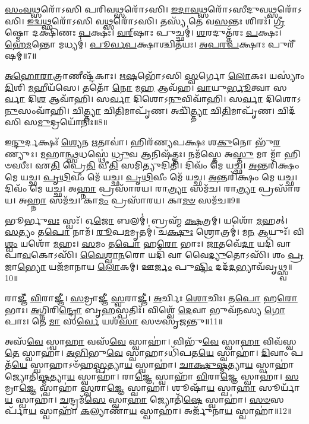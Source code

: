    \ul{𑌸𑌂}\-\-\ul{𑌵}\-\-\ul{𑌥𑍍𑌸}\-𑌰𑍋᳴𑌽𑌸𑌿 𑌪𑌰𑌿𑌵\-\ul{𑌥𑍍𑌸}\-𑌰𑍋᳴\-𑌽𑌸𑌿।
   \ul{𑌇}\-\-\ul{𑌦𑌾}\-\-\ul{𑌵}\-\-\ul{𑌥𑍍𑌸}\-𑌰𑍋᳴𑌽𑌸𑍀𑌦𑍁𑌵\-\ul{𑌥𑍍𑌸}\-𑌰𑍋᳴\-𑌽𑌸𑌿।
   \ul{𑌇}\-\-\ul{𑌦𑍍𑌵}\-\-\ul{𑌥𑍍𑌸}\-𑌰𑍋᳴𑌽𑌸𑌿 𑌵\-\ul{𑌥𑍍𑌸}\-𑌰𑍋᳴\-𑌽𑌸𑌿।
   𑌤𑌸𑍍𑌯᳴ 𑌤𑍇 𑌵\-\ul{𑌸}\-𑌨𑍍𑌤𑌃 𑌶𑌿𑌰𑌃᳴।
   \ul{𑌗𑍍𑌰𑍀}\-𑌷𑍍𑌮𑍋 𑌦𑌕𑍍𑌷𑌿᳴𑌣𑌃 \ul{𑌪}\-𑌕𑍍𑌷𑌃।
   \ul{𑌵}\-\ul{𑌰𑍍}‌𑌷𑌾𑌃 𑌪𑍁𑌚𑍍𑌛𑌮𑍍॑।
   \ul{𑌶}\-𑌰𑌦𑍁𑌤𑍍𑌤᳴𑌰𑌃 \ul{𑌪}\-𑌕𑍍𑌷𑌃।
   \ul{𑌹𑍇}\-\-\ul{𑌮}\-𑌨𑍍𑌤𑍋 𑌮𑌧𑍍𑌯𑌮𑍍॑।
   \ul{𑌪𑍂}\-\-\ul{𑌰𑍍𑌵}\-\-\ul{𑌪}\-𑌕𑍍𑌷𑌾𑌶𑍍𑌚𑌿𑌤᳴𑌯𑌃।
   \ul{𑌅}\-\-\ul{𑌪}\-\-\ul{𑌰}\-\-\ul{𑌪}\-𑌕𑍍𑌷𑌾𑌃 𑌪𑍁𑌰𑍀᳴𑌷𑌮𑍍॥7॥

   \ul{𑌅}\-\-\ul{𑌹𑍋}\-\-\ul{𑌰𑌾}\-𑌤𑍍𑌰𑌾𑌣𑍀𑌷𑍍𑌟᳴𑌕𑌾𑌃।
   \ul{𑌋}\-\-\ul{𑌷}\-𑌭𑍋᳴𑌽𑌸𑌿 \ul{𑌸𑍍𑌵}\-𑌰𑍍𑌗𑍋 \ul{𑌲𑍋}\-𑌕𑌃।
   𑌯𑌸𑍍𑌯𑌾𑌂॑ \ul{𑌦𑌿}\-𑌶𑌿 \ul{𑌮}\-𑌹𑍀𑌯᳴𑌸𑍇।
   𑌤𑌤𑍋᳴ \ul{𑌨𑍋} 𑌮\-\ul{𑌹} 𑌆𑌵᳴𑌹।
   \ul{𑌵𑌾}\-𑌯𑍁\-\ul{𑌰𑍍𑌭𑍂}\-𑌤𑍍𑌵𑌾 𑌸\-\ul{𑌰𑍍𑌵𑌾} 𑌦𑌿\-\ul{𑌶} 𑌆𑌵𑌾᳴𑌹𑌿।
   𑌸\-\ul{𑌰𑍍𑌵𑌾} 𑌦𑌿𑌶𑍋𑌽\-\ul{𑌨𑍁}\-𑌵𑌿𑌵𑌾᳴𑌹𑌿।
   𑌸\-\ul{𑌰𑍍𑌵𑌾} 𑌦𑌿𑌶𑍋𑌽\-\ul{𑌨𑍁}\-𑌸𑌂𑌵𑌾᳴𑌹𑌿।
   𑌚𑌿\-\ul{𑌤𑍍𑌤𑍍𑌯𑌾} 𑌚𑌿\-\ul{𑌤𑌿}\-𑌮𑌾𑌪𑍃᳴𑌣।
   𑌅𑌚𑌿᳴\-\ul{𑌤𑍍𑌤𑍍𑌯𑌾}  𑌚𑌿\-\ul{𑌤𑌿}\-𑌮𑌾𑌪𑍃᳴𑌣।
   𑌚𑌿𑌦᳴𑌸𑌿 𑌸\-\ul{𑌮𑍁}\-𑌦𑍍𑌰𑌯𑍋᳴𑌨𑌿𑌃॥8॥

   𑌇\-\ul{𑌨𑍍𑌦𑍁}\-𑌰𑍍𑌦𑌕𑍍𑌷𑌃᳴ \ul{𑌶𑍍𑌯𑍇}\-𑌨 \ul{𑌋}\-𑌤𑌾𑌵𑌾॑।
   𑌹𑌿𑌰᳴𑌣𑍍𑌯𑌪𑌕𑍍𑌷𑌃 𑌶\-\ul{𑌕𑍁}\-𑌨𑍋 𑌭𑍁᳴\-\ul{𑌰}\-𑌣𑍍𑌯𑍁𑌃।
   \ul{𑌮}\-𑌹𑌾\-\ul{𑌨𑍍𑌥𑍍𑌸}\-𑌧𑌸𑍍𑌥𑍇॑ \ul{𑌧𑍍𑌰𑍁}\-𑌵 𑌆𑌨𑌿𑌷᳴𑌤𑍍𑌤𑌃।
   𑌨𑌮᳴𑌸𑍍𑌤𑍇 𑌅\-\ul{𑌸𑍍𑌤𑍁} 𑌮𑌾 𑌮𑌾᳴ 𑌹𑌿𑍞𑌸𑍀𑌃।
   𑌏\-\ul{𑌤𑌿} 𑌪𑍍𑌰𑍇\-\ul{𑌤𑌿} 𑌵𑍀\-\ul{𑌤𑌿} 𑌸𑌮𑌿𑌤𑍍𑌯𑍁𑌦𑌿𑌤𑌿᳴।
   𑌦𑌿𑌵𑌂᳴ 𑌮𑍇 𑌯𑌚𑍍𑌛।
   \ul{𑌅}\-𑌨𑍍𑌤𑌰𑌿᳴𑌕𑍍𑌷𑌂 𑌮𑍇 𑌯𑌚𑍍𑌛।
   \ul{𑌪𑍃}\-\-\ul{𑌥𑌿}\-𑌵𑍀𑌂 𑌮𑍇᳴ 𑌯𑌚𑍍𑌛।
   \ul{𑌪𑍃}\-\-\ul{𑌥𑌿}\-𑌵𑍀𑌂 𑌮𑍇᳴ 𑌯𑌚𑍍𑌛।
   \ul{𑌅}\-𑌨𑍍𑌤𑌰𑌿᳴𑌕𑍍𑌷𑌂 𑌮𑍇 𑌯𑌚𑍍𑌛।
   𑌦𑌿𑌵𑌂᳴ 𑌮𑍇 𑌯𑌚𑍍𑌛।
   𑌅\-\ul{𑌹𑍍𑌨𑌾} 𑌪𑍍𑌰𑌸𑌾᳴𑌰𑌯।
   𑌰𑌾\-\ul{𑌤𑍍𑌰𑍍𑌯𑌾} 𑌸𑌮᳴𑌚।
   𑌰𑌾\-\ul{𑌤𑍍𑌰𑍍𑌯𑌾} 𑌪𑍍𑌰𑌸𑌾᳴𑌰𑌯।
   𑌅\-\ul{𑌹𑍍𑌨𑌾} 𑌸𑌮᳴𑌚।
   𑌕𑌾\-\ul{𑌮𑌂} 𑌪𑍍𑌰𑌸𑌾᳴𑌰𑌯।
   𑌕𑌾\-\ul{𑌮}\-\-\ul{𑍞} 𑌸𑌮᳴𑌚॥9॥
   \anuvakamend

   𑌭𑍂𑌰𑍍𑌭𑍁\-\ul{𑌵𑌃} 𑌸𑍍𑌵𑌃᳴।
   𑌓\-\ul{𑌜𑍋} 𑌬𑌲𑌮𑍍॑।
   𑌬𑍍𑌰𑌹𑍍𑌮᳴ \ul{𑌕𑍍𑌷}\-𑌤𑍍𑌰𑌮𑍍।
   𑌯𑌶𑍋᳴ \ul{𑌮}\-𑌹𑌤𑍍।
   \ul{𑌸}\-𑌤𑍍𑌯𑌂 𑌤\-\ul{𑌪𑍋} 𑌨𑌾𑌮᳴।
   \ul{𑌰𑍂}\-𑌪\-\ul{𑌮}\-𑌮𑍃𑌤𑌮𑍍॑।
   𑌚\-\ul{𑌕𑍍𑌷𑍁𑌃} 𑌶𑍍𑌰𑍋𑌤𑍍𑌰𑌮𑍍॑।
   𑌮\-\ul{𑌨} 𑌆𑌯𑍁𑌃᳴।
   𑌵𑌿\-\ul{𑌶𑍍𑌵𑌂} 𑌯𑌶𑍋᳴ \ul{𑌮}\-𑌹𑌃।
   \ul{𑌸}\-𑌮𑌂 𑌤\-\ul{𑌪𑍋} 𑌹\-\ul{𑌰𑍋} 𑌭𑌾𑌃।
   \ul{𑌜𑌾}\-𑌤𑌵𑍇᳴\-\ul{𑌦𑌾} 𑌯𑌦𑌿᳴ 𑌵𑌾 𑌪𑌾\-\ul{𑌵}\-𑌕𑍋𑌽𑌸𑌿᳴।
   \ul{𑌵𑍈}\-\-\ul{𑌶𑍍𑌵𑌾}\-\-\ul{𑌨}\-𑌰𑍋 𑌯𑌦𑌿᳴ 𑌵𑌾 𑌵𑍈\-\ul{𑌦𑍍𑌯𑍁}\-𑌤𑍋𑌽𑌸𑌿᳴।
   𑌶𑌂 \ul{𑌪𑍍𑌰}\-𑌜𑌾\-\ul{𑌭𑍍𑌯𑍋} 𑌯𑌜᳴𑌮𑌾𑌨𑌾𑌯 \ul{𑌲𑍋}\-𑌕𑌮𑍍।
   𑌊\-\ul{𑌰𑍍𑌜𑌂} 𑌪𑍁\-\ul{𑌷𑍍𑌟𑌿𑌂} 𑌦𑌦᳴\-\ul{𑌦}\-𑌭𑍍𑌯𑌾𑌵᳴𑌵𑍃𑌥𑍍𑌸𑍍𑌵॥10॥
   \anuvakamend

   𑌰𑌾𑌜𑍍𑌞𑍀᳴ \ul{𑌵𑌿}\-𑌰𑌾𑌜𑍍𑌞𑍀॑।
   \ul{𑌸}\-𑌮𑍍𑌰𑌾𑌜𑍍𑌞𑍀॑ \ul{𑌸𑍍𑌵}\-𑌰𑌾𑌜𑍍𑌞𑍀॑।
   \ul{𑌅}\-𑌰𑍍𑌚𑌿𑌃 \ul{𑌶𑍋}\-𑌚𑌿𑌃।
   𑌤\-\ul{𑌪𑍋} 𑌹\-\ul{𑌰𑍋} 𑌭𑌾𑌃।
   \ul{𑌅}\-𑌗𑍍𑌨𑌿𑌰𑌿\-\ul{𑌨𑍍𑌦𑍍𑌰𑍋} 𑌬𑍃\-\ul{𑌹}\-𑌸𑍍𑌪𑌤𑌿𑌃᳴।
   𑌵𑌿𑌶𑍍𑌵𑍇᳴ \ul{𑌦𑍇}\-𑌵𑌾 𑌭𑍁𑌵᳴𑌨𑌸𑍍𑌯 \ul{𑌗𑍋}\-𑌪𑌾𑌃।
   𑌤𑍇 \ul{𑌮𑌾} 𑌸\-\ul{𑌰𑍍𑌵𑍇} 𑌯𑌶᳴\-\ul{𑌸𑌾} 𑌸𑍞𑌸𑍃᳴𑌜𑌨𑍍𑌤𑍁॥11॥
\anuvakamend

   𑌅𑌸᳴\-\ul{𑌵𑍇} 𑌸𑍍𑌵𑌾\-\ul{𑌹𑌾} 𑌵𑌸᳴\-\ul{𑌵𑍇} 𑌸𑍍𑌵𑌾𑌹𑌾॑।
   𑌵𑌿𑌭𑍁᳴\-\ul{𑌵𑍇} 𑌸𑍍𑌵𑌾\-\ul{𑌹𑌾} 𑌵𑌿𑌵᳴𑌸𑍍𑌵\-\ul{𑌤𑍇} 𑌸𑍍𑌵𑌾𑌹𑌾॑।
   \ul{𑌅}\-\-\ul{𑌭𑌿}\-𑌭𑍁\-\ul{𑌵𑍇} 𑌸𑍍𑌵𑌾𑌹𑌾𑌽𑌧𑌿᳴𑌪𑌤\-\ul{𑌯𑍇} 𑌸𑍍𑌵𑌾𑌹𑌾॑।
   \ul{𑌦𑌿}\-𑌵𑌾𑌂 𑌪𑌤᳴\-\ul{𑌯𑍇} 𑌸𑍍𑌵𑌾𑌹𑌾𑌽𑍞᳴𑌹\-\ul{𑌸𑍍𑌪}\-𑌤𑍍𑌯𑌾\-\ul{𑌯} 𑌸𑍍𑌵𑌾𑌹𑌾॑।
   \ul{𑌚𑌾}\-\-\ul{𑌕𑍍𑌷𑍁}\-\-\ul{𑌷𑍍𑌮}\-𑌤𑍍𑌯𑌾\-\ul{𑌯} 𑌸𑍍𑌵𑌾𑌹𑌾॑ 𑌜𑍍𑌯𑍋𑌤𑌿\-\ul{𑌷𑍍𑌮}\-𑌤𑍍𑌯𑌾\-\ul{𑌯} 𑌸𑍍𑌵𑌾𑌹𑌾॑।
   𑌰𑌾\-\ul{𑌜𑍍𑌞𑍇} 𑌸𑍍𑌵𑌾𑌹𑌾᳴ \ul{𑌵𑌿}\-𑌰𑌾\-\ul{𑌜𑍍𑌞𑍇} 𑌸𑍍𑌵𑌾𑌹𑌾॑।
   \ul{𑌸}\-𑌮𑍍𑌰𑌾\-\ul{𑌜𑍍𑌞𑍇} 𑌸𑍍𑌵𑌾𑌹𑌾॑ \ul{𑌸𑍍𑌵}\-𑌰𑌾\-\ul{𑌜𑍍𑌞𑍇} 𑌸𑍍𑌵𑌾𑌹𑌾॑।
   𑌶𑍂𑌷𑌾᳴\-\ul{𑌯} 𑌸𑍍𑌵𑌾\-\ul{𑌹𑌾} 𑌸𑍂𑌰𑍍𑌯𑌾᳴\-\ul{𑌯} 𑌸𑍍𑌵𑌾𑌹𑌾॑।
   \ul{𑌚}\-𑌨𑍍𑌦𑍍𑌰𑌮᳴\-\ul{𑌸𑍇} 𑌸𑍍𑌵𑌾\-\ul{𑌹𑌾} 𑌜𑍍𑌯𑍋𑌤𑌿᳴\-\ul{𑌷𑍇} 𑌸𑍍𑌵𑌾𑌹𑌾॑।
   \ul{𑌸}\-\-\ul{𑍞}\-𑌸𑌰𑍍𑌪𑌾᳴\-\ul{𑌯} 𑌸𑍍𑌵𑌾𑌹𑌾᳴ \ul{𑌕}\-𑌲𑍍𑌯𑌾𑌣𑌾᳴\-\ul{𑌯} 𑌸𑍍𑌵𑌾𑌹𑌾॑।
   𑌅𑌰𑍍𑌜𑍁᳴𑌨𑌾\-\ul{𑌯} 𑌸𑍍𑌵𑌾𑌹𑌾॑॥12॥
\anuvakamend


